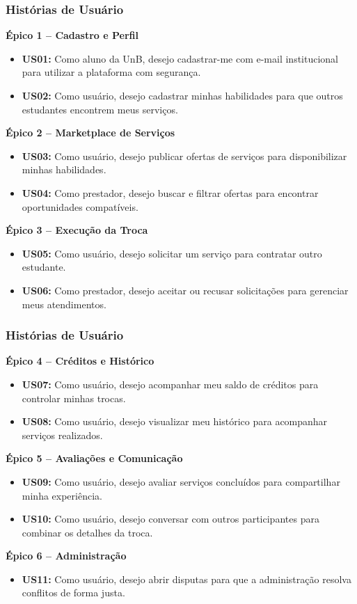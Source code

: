 \documentclass[aspectratio=169]{beamer}
\begin{document}
\begin{frame}
\frametitle{Histórias de Usuário}

\textbf{Épico 1 -- Cadastro e Perfil}
\begin{itemize}
    \item \textbf{US01:} Como aluno da UnB, desejo cadastrar-me com e-mail institucional para utilizar a plataforma com segurança.
    \item \textbf{US02:} Como usuário, desejo cadastrar minhas habilidades para que outros estudantes encontrem meus serviços.
\end{itemize}

\textbf{Épico 2 -- Marketplace de Serviços}
\begin{itemize}
    \item \textbf{US03:} Como usuário, desejo publicar ofertas de serviços para disponibilizar minhas habilidades.
    \item \textbf{US04:} Como prestador, desejo buscar e filtrar ofertas para encontrar oportunidades compatíveis.
\end{itemize}

\textbf{Épico 3 -- Execução da Troca}
\begin{itemize}
    \item \textbf{US05:} Como usuário, desejo solicitar um serviço para contratar outro estudante.
    \item \textbf{US06:} Como prestador, desejo aceitar ou recusar solicitações para gerenciar meus atendimentos.
\end{itemize}

\end{frame}

\begin{frame}
\frametitle{Histórias de Usuário}

\small

\textbf{Épico 4 -- Créditos e Histórico}
\begin{itemize}
    \item \textbf{US07:} Como usuário, desejo acompanhar meu saldo de créditos para controlar minhas trocas.
    \item \textbf{US08:} Como usuário, desejo visualizar meu histórico para acompanhar serviços realizados.
\end{itemize}

\textbf{Épico 5 -- Avaliações e Comunicação}
\begin{itemize}
    \item \textbf{US09:} Como usuário, desejo avaliar serviços concluídos para compartilhar minha experiência.
    \item \textbf{US10:} Como usuário, desejo conversar com outros participantes para combinar os detalhes da troca.
\end{itemize}

\textbf{Épico 6 -- Administração}
\begin{itemize}
    \item \textbf{US11:} Como usuário, desejo abrir disputas para que a administração resolva conflitos de forma justa.
\end{itemize}

\end{frame}
\end{document}
